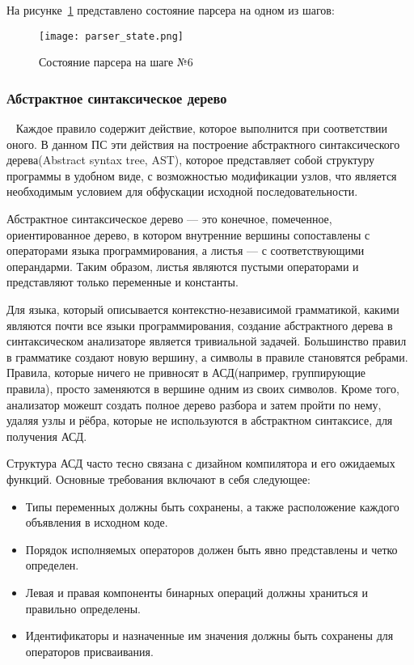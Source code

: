 На рисунке~\ref{fig:arch_and_mod::lr_example_img} представлено состояние парсера на одном из шагов:

\begin{figure}[!htb]
  \centering
  \texttt{[image: parser\_state.png]}
  \caption{ Состояние парсера на шаге №6 }
  \label{fig:arch_and_mod::lr_example_img}
\end{figure}

\FloatBarrier


\subsubsection{Абстрактное синтаксическое дерево}~
\label{sub:arch_and_mod:ast}
Каждое правило содержит действие, которое выполнится при соответствии оного. В данном ПС эти действия на построение абстрактного синтаксического дерева(Abstract syntax tree, AST), которое представляет собой структуру программы в удобном виде, с возможностью модификации узлов, что является необходимым условием для обфускации исходной последовательности.

Абстрактное синтаксическое дерево --- это конечное, помеченное, ориентированное дерево, в котором внутренние вершины сопоставлены с операторами языка программирования, а листья --- с соответствующими операндарми. Таким образом, листья являются пустыми операторами и представляют только переменные и константы\cite{ast}.

Для языка, который описывается контекстно-независимой грамматикой, какими являются почти все языки программирования, создание абстрактного дерева в синтаксическом анализаторе является тривиальной задачей. Большинство правил в грамматике создают новую вершину, а символы в правиле становятся ребрами. Правила, которые ничего не привносят в АСД(например, группирующие правила), просто заменяются в вершине одним из своих символов. Кроме того, анализатор можешт создать полное дерево разбора и затем пройти по нему, удаляя узлы и рёбра, которые не используются в абстрактном синтаксисе, для получения АСД.

Структура АСД часто тесно связана с дизайном компилятора и его ожидаемых функций.
Основные требования включают в себя следующее:
\begin{itemize}
\item  Типы переменных должны быть сохранены, а также расположение каждого объявления в исходном коде.
\item  Порядок исполняемых операторов должен быть явно представлены и четко определен.
\item  Левая и правая компоненты бинарных операций должны храниться и правильно определены.
\item  Идентификаторы и назначенные им значения должны быть сохранены для операторов присваивания.
\end{itemize}

